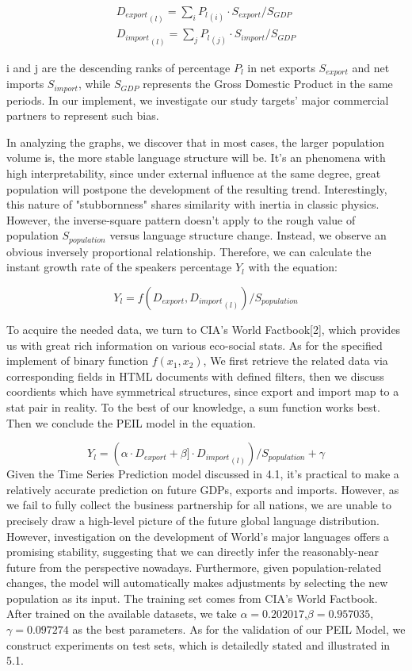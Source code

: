\documentclass{mcmthesis}
\begin{document}
  
  
  \begin{equation}
  \begin{aligned}
  {D_{export}}_{(l)}=\sum_{i}{P_{l}}_{(i)} \cdot S_{export}/S_{GDP}\\
  {D_{import}}_{(l)}=\sum_{j}{P_{l}}_{(j)} \cdot S_{import}/S_{GDP}
  \end{aligned}
  \end{equation}
  
  \indent i and j are the descending ranks of percentage $P_{l}$ in net exports $S_{export}$ and net imports $S_{import}$, while $S_{GDP}$ represents the Gross Domestic Product in the same periods. In our implement, we investigate our study targets' major commercial partners to represent such bias.
  
  \indent In analyzing the graphs, we discover that in most cases, the larger population volume is, the more stable language structure will be. It's an phenomena with high interpretability, since under external influence at the same degree, great population will postpone the development of the resulting trend. Interestingly, this nature of "stubbornness" shares similarity with inertia in classic physics. However, the inverse-square pattern doesn't apply to the rough value of population $S_{population}$ versus language structure change. Instead, we observe an obvious inversely proportional relationship. Therefore, we can calculate the instant growth rate of the speakers percentage $Y_{l}$ with the equation:  
  
  $$Y_{l}=f({D_{export}},{D_{import}}_{(l)})/S_{population}$$
  
  \indent To acquire the needed data, we turn to CIA's World Factbook[2], which provides us with great rich information on various eco-social stats. As for the specified implement of binary function $f(x_{1},x_{2})$, We first retrieve the related data via corresponding fields in HTML documents with defined filters, then we discuss coordients which have symmetrical structures, since export and import map to a stat pair in reality. To the best of our knowledge, a sum function works best. Then we conclude the PEIL model in the equation.
  
  $$Y_{l}=(\alpha \cdot {D_{export}}+ \beta ]\cdot {D_{import}}_{(l)})/S_{population} + \gamma$$
  \indent Given the Time Series Prediction model discussed in 4.1, it's practical to make a relatively accurate prediction on future GDPs, exports and imports. However, as we fail to fully collect the business partnership for all nations, we are unable to precisely draw a high-level picture of the future global language distribution. However, investigation on the development of World's major languages offers a promising stability, suggesting that we can directly infer the reasonably-near future from the perspective nowadays. Furthermore, given population-related changes, the model will automatically makes adjustments by selecting the new population as its input. 
  \indent The training set comes from CIA's World Factbook. After trained on the available datasets, we take $\alpha=0.202017$,$\beta=0.957035$,$\gamma=0.097274$ as the best parameters. As for the validation of our PEIL Model, we construct experiments on test sets, which is detailedly stated and illustrated in 5.1.
\end{document}
